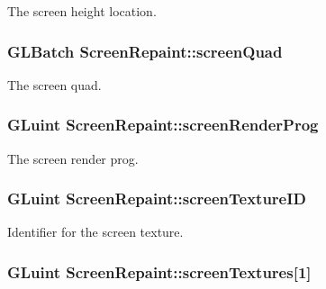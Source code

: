The screen height location. \hypertarget{class_screen_repaint_a0c691cfa0f3d656b02c019edf8944b6c}{
\subsubsection[{screen\-Quad}]{\setlength{\rightskip}{0pt plus 5cm}G\-L\-Batch {\bf Screen\-Repaint\-::screen\-Quad}}}\label{class_screen_repaint_a0c691cfa0f3d656b02c019edf8944b6c}
The screen quad. \hypertarget{class_screen_repaint_a89572d6a5da58811afcf33c26d007dd9}{
\subsubsection[{screen\-Render\-Prog}]{\setlength{\rightskip}{0pt plus 5cm}G\-Luint {\bf Screen\-Repaint\-::screen\-Render\-Prog}}}\label{class_screen_repaint_a89572d6a5da58811afcf33c26d007dd9}
The screen render prog. \hypertarget{class_screen_repaint_afeebcd4de6dcc325a5fb59b154206823}{
\subsubsection[{screen\-Texture\-I\-D}]{\setlength{\rightskip}{0pt plus 5cm}G\-Luint {\bf Screen\-Repaint\-::screen\-Texture\-I\-D}}}\label{class_screen_repaint_afeebcd4de6dcc325a5fb59b154206823}
Identifier for the screen texture. \hypertarget{class_screen_repaint_affc1c0876ba5d8401938b166e6314e8c}{
\subsubsection[{screen\-Textures}]{\setlength{\rightskip}{0pt plus 5cm}G\-Luint {\bf Screen\-Repaint\-::screen\-Textures}\mbox{[}1\mbox{]}}}\label{class_screen_repaint_affc1c0876ba5d8401938b166e6314e8c}
